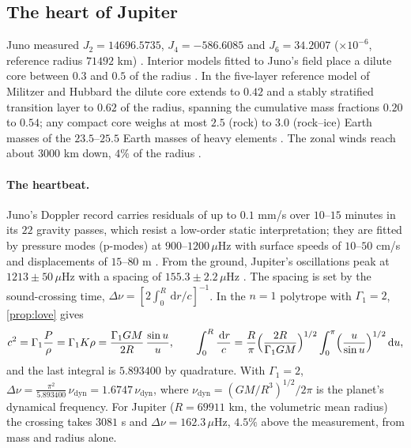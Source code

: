 \documentclass[11pt]{article}
\theoremstyle{definition}\newtheorem{definition}[theorem]{Definition}
\theoremstyle{remark}\newtheorem{remark}[theorem]{Remark}
\newcommand{\dd}{\,\mathrm d}\newcommand{\e}{\mathrm e}
\newcommand{\muH}{\,\mu\mathrm{Hz}}
\begin{document}
\subsection{The heart of Jupiter}\label{sec:jupheart}
Juno measured $J_2=14696.5735$, $J_4=-586.6085$ and $J_6=34.2007$ ($\times10^{-6}$, reference radius $71492$ km) \cite{Durante2020}. Interior models fitted to Juno's field place a dilute core between $0.3$ and $0.5$ of the radius \cite{Wahl}. In the five-layer reference model of Militzer and Hubbard the dilute core extends to $0.42$ and a stably stratified transition layer to $0.62$ of the radius, spanning the cumulative mass fractions $0.20$ to $0.54$; any compact core weighs at most $2.5$ (rock) to $3.0$ (rock--ice) Earth masses of the $23.5$--$25.5$ Earth masses of heavy elements \cite{Militzer2024}. The zonal winds reach about $3000$ km down, $4\%$ of the radius \cite{Kaspi2018,Kaspi2020}.

\paragraph{The heartbeat.} Juno's Doppler record carries residuals of up to $0.1$ mm/s over $10$--$15$ minutes in its $22$ gravity passes, which resist a low-order static interpretation; they are fitted by pressure modes (p-modes) at $900$--$1200\muH$ with surface speeds of $10$--$50$ cm/s and displacements of $15$--$80$ m \cite{Durante2022}. From the ground, Jupiter's oscillations peak at $1213\pm50\muH$ with a spacing of $155.3\pm2.2\muH$ \cite{Gaulme}. The spacing is set by the sound-crossing time, $\Delta\nu=[2\int_0^R\dd r/c]^{-1}$. In the $n=1$ polytrope with $\Gamma_1=2$, \cref{prop:love} gives
\[
c^2=\Gamma_1\frac P\rho=\Gamma_1K\rho=\frac{\Gamma_1GM}{2R}\,\frac{\sin u}{u},\qquad
\int_0^R\frac{\dd r}{c}=\frac R\pi\Bigl(\frac{2R}{\Gamma_1GM}\Bigr)^{1/2}\int_0^\pi\Bigl(\frac u{\sin u}\Bigr)^{1/2}\dd u ,
\]
and the last integral is $5.893400$ by quadrature. With $\Gamma_1=2$, $\Delta\nu=\frac{\pi^2}{5.893400}\,\nu_\mathrm{dyn}=1.6747\,\nu_\mathrm{dyn}$, where $\nu_\mathrm{dyn}=(GM/R^3)^{1/2}/2\pi$ is the planet's dynamical frequency. For Jupiter ($R=69911$ km, the volumetric mean radius) the crossing takes $3081$ s and $\Delta\nu=162.3\muH$, $4.5\%$ above the measurement, from mass and radius alone.
\end{document}
